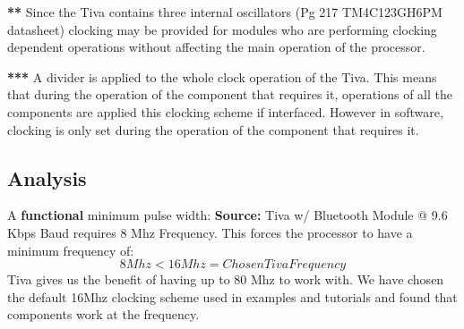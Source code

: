 	\textbf{**} Since the Tiva contains three internal oscillators (Pg 217 TM4C123GH6PM datasheet) clocking may be provided for modules who are performing clocking dependent operations without affecting the main operation of the processor.

	\textbf{***} A divider is applied to the whole clock operation of the Tiva. This means that during the operation of the component that requires it, operations of all the components are applied this clocking scheme if interfaced. However in software, clocking is only set during the operation of the component that requires it.

	\subsection{Analysis}


		\noindent A \textbf{functional} minimum pulse width:
		\noindent \textbf{Source:} Tiva w/ Bluetooth Module @ 9.6 Kbps Baud requires 8 Mhz Frequency.
		\noindent This forces the processor to have a minimum frequency of:
				\textbf{$$ 8 Mhz <  16Mhz = ChosenTivaFrequency $$}
		\noindent Tiva gives us the benefit of having up to 80 Mhz to work with. We have chosen the default 16Mhz clocking scheme used in examples and tutorials and found that components work at the frequency.

